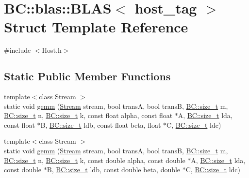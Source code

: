 \hypertarget{structBC_1_1blas_1_1BLAS_3_01host__tag_01_4}{}\section{BC\+:\+:blas\+:\+:B\+L\+AS$<$ host\+\_\+tag $>$ Struct Template Reference}
\label{structBC_1_1blas_1_1BLAS_3_01host__tag_01_4}


{\ttfamily \#include $<$Host.\+h$>$}

\subsection*{Static Public Member Functions}
\begin{DoxyCompactItemize}
\item 
{\footnotesize template$<$class Stream $>$ }\\static void \hyperlink{structBC_1_1blas_1_1BLAS_3_01host__tag_01_4_a65c15c72e8a51fa92e4e12b80e874b38}{gemm} (\hyperlink{namespaceBC_abc64a63cd29a22d102a68f478dfd588d}{Stream} stream, bool transA, bool transB, \hyperlink{namespaceBC_a6007cbc4eeec401a037b558910a56173}{B\+C\+::size\+\_\+t} m, \hyperlink{namespaceBC_a6007cbc4eeec401a037b558910a56173}{B\+C\+::size\+\_\+t} n, \hyperlink{namespaceBC_a6007cbc4eeec401a037b558910a56173}{B\+C\+::size\+\_\+t} k, const float alpha, const float $\ast$A, \hyperlink{namespaceBC_a6007cbc4eeec401a037b558910a56173}{B\+C\+::size\+\_\+t} lda, const float $\ast$B, \hyperlink{namespaceBC_a6007cbc4eeec401a037b558910a56173}{B\+C\+::size\+\_\+t} ldb, const float beta, float $\ast$C, \hyperlink{namespaceBC_a6007cbc4eeec401a037b558910a56173}{B\+C\+::size\+\_\+t} ldc)
\item 
{\footnotesize template$<$class Stream $>$ }\\static void \hyperlink{structBC_1_1blas_1_1BLAS_3_01host__tag_01_4_a1ff65b6c23f3d711a746f67196aabd2b}{gemm} (\hyperlink{namespaceBC_abc64a63cd29a22d102a68f478dfd588d}{Stream} stream, bool transA, bool transB, \hyperlink{namespaceBC_a6007cbc4eeec401a037b558910a56173}{B\+C\+::size\+\_\+t} m, \hyperlink{namespaceBC_a6007cbc4eeec401a037b558910a56173}{B\+C\+::size\+\_\+t} n, \hyperlink{namespaceBC_a6007cbc4eeec401a037b558910a56173}{B\+C\+::size\+\_\+t} k, const double alpha, const double $\ast$A, \hyperlink{namespaceBC_a6007cbc4eeec401a037b558910a56173}{B\+C\+::size\+\_\+t} lda, const double $\ast$B, \hyperlink{namespaceBC_a6007cbc4eeec401a037b558910a56173}{B\+C\+::size\+\_\+t} ldb, const double beta, double $\ast$C, \hyperlink{namespaceBC_a6007cbc4eeec401a037b558910a56173}{B\+C\+::size\+\_\+t} ldc)

\end{DoxyCompactItemize}
